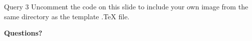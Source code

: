 \documentclass[aspectratio=169,xcolor=dvipsnames]{beamer}
\begin{document}

\begin{frame}{Query 3}
	Uncomment the code on this slide to include your own image from the same directory as the template .TeX file.
\end{frame}


\begin{frame}
	\Huge{\centerline{\textbf{Questions?}}}
\end{frame}

\end{document}

